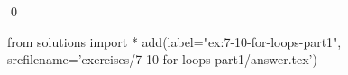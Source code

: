 
\begin{ex}
  \label{ex:7-10-for-loops-part1}
  
  \qed
\end{ex}
\begin{python0}
from solutions import *
add(label="ex:7-10-for-loops-part1",
    srcfilename='exercises/7-10-for-loops-part1/answer.tex')
\end{python0}
